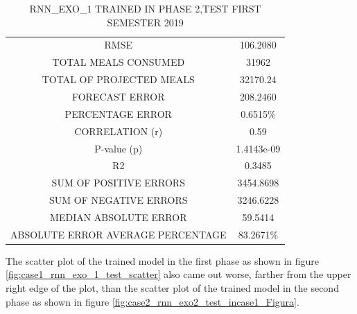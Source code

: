             \begin{table}[!ht]
            \centering
            \caption{RNN\_EXO\_1 TRAINED IN PHASE 2,TEST FIRST SEMESTER 2019}
            \label{table:case2_rnn_exo_2_incase1}
                \begin{tabular}{c|c}
                \rowcolor{gray!50}
                \hline
                \multicolumn{2}{c}{RNN\_EXO\_1 TRAINED IN PHASE 2,TEST FIRST SEMESTER 2019}\\ \hline
                RMSE & 106.2080\\
                TOTAL MEALS CONSUMED & 31962\\
                TOTAL OF PROJECTED MEALS & 32170.24\\
                FORECAST ERROR & 208.2460 \\
                PERCENTAGE ERROR & 0.6515\%  \\
                CORRELATION (r)& 0.59 \\
                P-value (p) & 1.4143e-09\\
                R2 & 0.3485\\
                SUM OF POSITIVE ERRORS & 3454.8698\\
                SUM OF NEGATIVE ERRORS & 3246.6228\\
                MEDIAN ABSOLUTE ERROR & 59.5414\\
                ABSOLUTE ERROR AVERAGE PERCENTAGE & 83.2671\% \\ \hline
            \end{tabular}
            \end{table}
                
            
            
        The scatter plot of the trained model in the first phase as shown in figure \ref{fig:case1_rnn_exo_1_test_scatter} also came out worse, farther from the upper right edge of the plot, than the scatter plot of the trained model in the second phase as shown in figure  \ref{fig:case2_rnn_exo2_test_incase1_Figura}.
        
